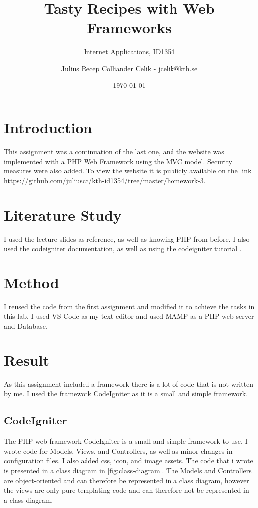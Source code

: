 \documentclass[a4paper]{scrartcl}
\title{Tasty Recipes with Web Frameworks}
\subtitle{Internet Applications, ID1354}
\author{Julius Recep Colliander Celik - jcelik@kth.se}
\date{\today}
\begin{document}
\maketitle

\section{Introduction}

This assignment was a continuation of the last one, and the website was implemented with a PHP Web Framework using the MVC model. Security measures were also added. To view the website it is publicly available on the link \href{https://github.com/juliuscc/kth-id1354/tree/master/homework-3}{https://github.com/juliuscc/kth-id1354/tree/master/homework-3}.

\section{Literature Study}

I used the lecture slides as reference, as well as knowing PHP from before. I also used the codeigniter documentation\cite{BritishColumbiaInstituteofTechnology}, as well as using the codeigniter tutorial \cite{Technology}.

\section{Method}

I reused the code from the first assignment and modified it to achieve the tasks in this lab. I used VS Code as my text editor and used MAMP as a PHP web server and Database.

\section{Result}

As this assignment included a framework there is a lot of code that is not written by me. I used the framework CodeIgniter as it is a small and simple framework.

\subsection{CodeIgniter}
The PHP web framework CodeIgniter is a small and simple framework to use. I wrote code for Models, Views, and Controllers, as well as minor changes in configuration files. I also added css, icon, and image assets. The code that i wrote is presented in a class diagram in \ref{fig:class-diagram}. The Models and Controllers are object-oriented and can therefore be represented in a class diagram, however the views are only pure templating code and can therefore not be represented in a class diagram.
\end{document}
